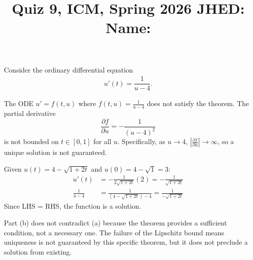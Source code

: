 \documentclass[reqno]{exam}
\title{\normalsize{Quiz 9, ICM, Spring 2026 \hspace{1ex} JHED: \underline{\hspace{20ex}} \hspace{2ex} Name: \underline{\hspace{40ex}}}}
\author{}
\date{}
\begin{document}
\maketitle
\vspace{-2cm} %

\begin{questions}
\question
  Consider the ordinary differential equation
  \begin{align*}
    u'(t) = \dfrac{1}{u - 4}.
  \end{align*}

  \begin{solution}
    The ODE $u' = f(t, u)$ where $f(t, u) = \frac{1}{u-4}$ does not satisfy the theorem. The partial derivative
    $$\frac{\partial f}{\partial u} = -\frac{1}{(u-4)^2}$$
    is not bounded on $t \in [0, 1]$ for all $u$. Specifically, as $u \to 4$, $|\frac{\partial f}{\partial u}| \to \infty$, so a unique solution is not guaranteed.

    Given $u(t) = 4 - \sqrt{1 + 2t}$ and $u(0) = 4 - \sqrt{1} = 3$:
    \begin{align*}
      u'(t)         & = -\frac{1}{2\sqrt{1+2t}}(2) = -\frac{1}{\sqrt{1+2t}}      \\
      \frac{1}{u-4} & = \frac{1}{(4 - \sqrt{1+2t}) - 4} = \frac{1}{-\sqrt{1+2t}}
    \end{align*}
    Since LHS = RHS, the function is a solution.

    Part (b) does not contradict (a) because the theorem provides a sufficient condition, not a necessary one. The failure of the Lipschitz bound means uniqueness is not guaranteed by this specific theorem, but it does not preclude a solution from existing.


\end{solution}
\end{questions}
\end{document}
